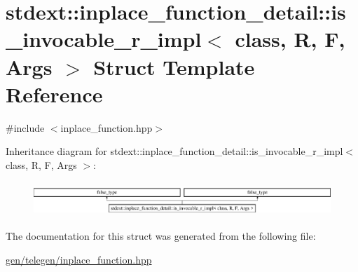 \hypertarget{structstdext_1_1inplace__function__detail_1_1is__invocable__r__impl}{}\section{stdext\+:\+:inplace\+\_\+function\+\_\+detail\+:\+:is\+\_\+invocable\+\_\+r\+\_\+impl$<$ class, R, F, Args $>$ Struct Template Reference}
\label{structstdext_1_1inplace__function__detail_1_1is__invocable__r__impl}


{\ttfamily \#include $<$inplace\+\_\+function.\+hpp$>$}

Inheritance diagram for stdext\+:\+:inplace\+\_\+function\+\_\+detail\+:\+:is\+\_\+invocable\+\_\+r\+\_\+impl$<$ class, R, F, Args $>$\+:\begin{figure}[H]
\begin{center}
\leavevmode
\includegraphics[height=1.305361cm]{structstdext_1_1inplace__function__detail_1_1is__invocable__r__impl}
\end{center}
\end{figure}


The documentation for this struct was generated from the following file\+:\begin{DoxyCompactItemize}
\item 
\hyperlink{gen_2telegen_2inplace__function_8hpp}{gen/telegen/inplace\+\_\+function.\+hpp}\end{DoxyCompactItemize}
